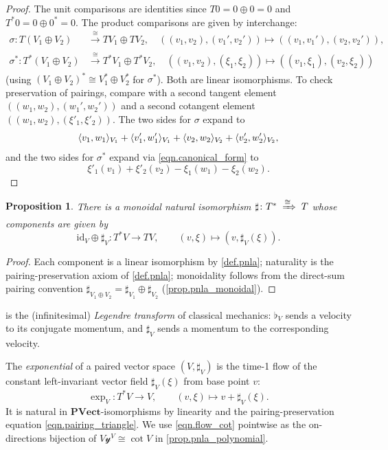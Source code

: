 \documentclass[11pt, oneside, article]{memoir}
\theoremstyle{definition}
\theoremstyle{plain}
\newtheorem{proposition}[proposition]{Proposition}
\newenvironment{remark}
  {\pushQED{\qed}\renewcommand{\qedsymbol}{$\lozenge$}\remarkx}
  {\popQED\endremarkx}
\DeclarePairedDelimiter{\pairing}{\langle}{\rangle}
\newcommand{\Cat}[1]{\mathbf{#1}}%
\newcommand{\id}{\mathrm{id}}
\newcommand{\To}[2][]{\xrightarrow[#1]{#2}}
\newcommand{\yon}{\mathcal{y}}
\newcommand{\pvect}{\Cat{PVect}}
\begin{document}
\begin{proof}
The unit comparisons are identities since $T0=0\oplus 0=0$ and $T^*0=0\oplus 0^*=0$. The product comparisons are given by interchange:
\begin{align}
\sigma\colon T(V_1\oplus V_2)&\To{\cong}TV_1\oplus TV_2,\quad ((v_1,v_2),(v_1',v_2'))\mapsto((v_1,v_1'),(v_2,v_2')),\label{eqn.T_swap}\\
\sigma^*\colon T^*(V_1\oplus V_2)&\To{\cong}T^*V_1\oplus T^*V_2,\quad ((v_1,v_2),(\xi_1,\xi_2))\mapsto((v_1,\xi_1),(v_2,\xi_2))\label{eqn.Tstar_swap}
\end{align}
(using $(V_1\oplus V_2)^*\cong V_1^*\oplus V_2^*$ for $\sigma^*$). Both are linear isomorphisms. To check preservation of pairings, compare with a second tangent element $((w_1,w_2),(w_1',w_2'))$ and a second cotangent element $((w_1,w_2),(\xi'_1,\xi'_2))$. The two sides for $\sigma$ expand to
\[
\pairing{v_1,w_1}_{V_1}+\pairing{v_1',w_1'}_{V_1}+\pairing{v_2,w_2}_{V_2}+\pairing{v_2',w_2'}_{V_2},
\]
and the two sides for $\sigma^*$ expand via \eqref{eqn.canonical_form} to
\[
\xi'_1(v_1)+\xi'_2(v_2)-\xi_1(w_1)-\xi_2(w_2).
\]
\qedhere
\end{proof}

\begin{proposition}\label{prop.legendre}
There is a monoidal natural isomorphism $\sharp\colon T^*\;\xRightarrow{\cong}\;T$ whose components are given by
\[
\id_V\oplus\sharp_V\colon T^*V\to TV,\qquad (v,\xi)\mapsto(v,\sharp_V(\xi)).
\]
\end{proposition}

\begin{proof}
Each component is a linear isomorphism by \cref{def.pnla}; naturality is the pairing-preservation axiom of \cref{def.pnla}; monoidality follows from the direct-sum pairing convention $\sharp_{V_1\oplus V_2}=\sharp_{V_1}\oplus\sharp_{V_2}$ (\cref{prop.pnla_monoidal}).\qedhere
\end{proof}

\begin{remark}[Legendre transform]\label{rmk.legendre}
 is the (infinitesimal) \emph{Legendre transform} of classical mechanics: $\flat_V$ sends a velocity to its conjugate momentum, and $\sharp_V$ sends a momentum to the corresponding velocity.\qedhere
\end{remark}

The \emph{exponential} of a paired vector space $(V,\sharp_V)$ is the time-1 flow of the constant left-invariant vector field $\sharp_V(\xi)$ from base point $v$:
\begin{equation}\label{eqn.flow_cot}
\exp_V\colon T^*V\to V,\qquad (v,\xi)\longmapsto v+\sharp_V(\xi).
\end{equation}
It is natural in $\pvect$-isomorphisms by linearity and the pairing-preservation equation \eqref{eqn.pairing_triangle}. We use \eqref{eqn.flow_cot} pointwise as the on-directions bijection of $V\yon^V\cong\cot{V}$ in \cref{prop.pnla_polynomial}.
\end{document}
